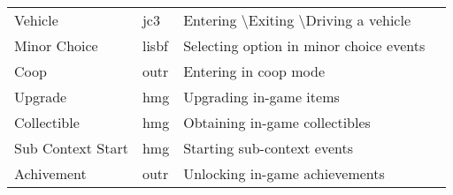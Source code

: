 \begin{table}[H]
\begin{tabularx}{\textwidth}{@{}lllX@{}}
Vehicle                                 & jc3                                       & Entering \textbackslash Exiting \textbackslash Driving a vehicle \\
Minor Choice                            & lisbf                                     & Selecting option in minor choice events                          \\
Coop                                    & outr                                      & Entering in coop mode                                            \\
Upgrade                                 & hmg                                       & Upgrading in-game items                                          \\
Collectible                             & hmg                                       & Obtaining in-game collectibles                                   \\
Sub Context Start                       & hmg                                       & Starting sub-context events                                      \\
Achivement                              & outr                                      & Unlocking in-game achievements                                   \\ \hline
  \end{tabularx}
\end{table}
